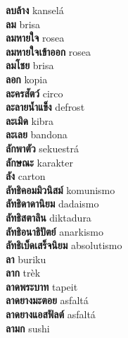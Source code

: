 \textbf{ ลบล้าง  } kanselá \\
\textbf{ ลม  } brisa \\
\textbf{ ลมหายใจ  } rosea \\
\textbf{ ลมหายใจเข้าออก  } rosea \\
\textbf{ ลมโชย  } brisa \\
\textbf{ ลอก  } kopia \\
\textbf{ ละครสัตว์  } circo \\
\textbf{ ละลายน้ำแข็ง  } defrost \\
\textbf{ ละเมิด  } kibra \\
\textbf{ ละเลย  } bandona \\
\textbf{ ลักพาตัว  } sekuestrá \\
\textbf{ ลักษณะ  } karakter \\
\textbf{ ลัง  } carton \\
\textbf{ ลัทธิคอมมิวนิสม์  } komunismo \\
\textbf{ ลัทธิดาดานิยม  } dadaismo \\
\textbf{ ลัทธิสตาลิน  } diktadura \\
\textbf{ ลัทธิอนาธิปัตย์  } anarkismo \\
\textbf{ ลัทธิเบ็ดเสร็จนิยม  } absolutismo \\
\textbf{ ลา  } buriku \\
\textbf{ ลาก  } trèk \\
\textbf{ ลาดพระบาท  } tapeit \\
\textbf{ ลาดยางมะตอย  } asfaltá \\
\textbf{ ลาดยางแอสฟัลต์  } asfaltá \\
\textbf{ ลามก  } sushi \\
